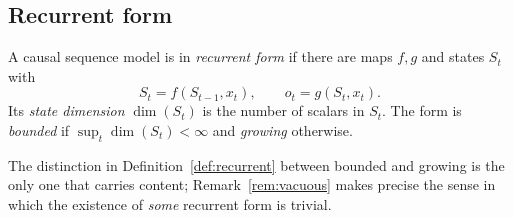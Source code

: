 \subsection{Recurrent form}

\begin{definition}
\label{def:recurrent}
A causal sequence model is in \emph{recurrent form} if there are maps $f, g$ and
states $S_t$ with
\begin{equation}
  S_t = f(S_{t-1}, x_t), \qquad o_t = g(S_t, x_t) .
\end{equation}
Its \emph{state dimension} $\dim(S_t)$ is the number of scalars in $S_t$. The
form is \emph{bounded} if $\sup_t \dim(S_t) < \infty$ and \emph{growing}
otherwise.
\end{definition}

The distinction in Definition~\ref{def:recurrent} between bounded and growing is
the only one that carries content; Remark~\ref{rem:vacuous} makes precise the
sense in which the existence of \emph{some} recurrent form is trivial.
